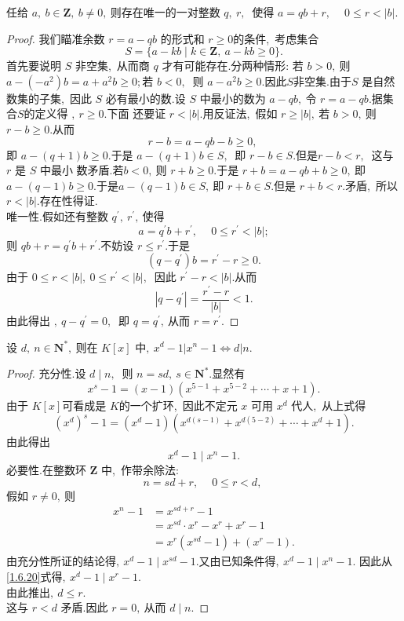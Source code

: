 \newpage
\begin{theorem}
	任给 $ a,\  b \in \mathbf{Z},\  b \neq 0 ,\  $则存在唯一的一对整数 $ q,\  r ,\ $ 使得
	$a=q b+r,\  \quad 0 \leqslant r<|b| .$
\end{theorem}
\begin{proof}
	我们瞄准余数  $r=a-q b$  的形式和 $ r \geqslant 0  $的条件,\  考虑集合
	$$S=\{a-k b \mid k \in \mathbf{Z},\  a-k b \geqslant 0\} .$$
	首先要说明 $ S $ 非空集,\  从而商 $ q $ 才有可能存在.分两种情形: 若  $b>0 ,\  $则  $a-\left(-a^{2}\right) b   =a+a^{2} b \geqslant 0 ; $若 $ b<0 ,\ $ 则 $ a-a^{2} b \geqslant 0 .$因此$  S  $非空集.由于$  S $ 是自然数集的子集,\  因此 $ S $ 必有最小的数.设 $ S $ 中最小的数为  $a-q b ,\  $令 $ r=a-q b .$据集合$  S  $的定义得 $,\  r \geqslant 0  .$下面 还要证 $ r<|b| .$用反证法,\  假如 $ r \geqslant|b| ,\  $若 $ b>0 ,\  $则  $r-b \geqslant 0  .$从而
	$$r-b=a-q b-b \geqslant 0,\ $$
	即  $a-(q+1) b \geqslant 0 .$于是  $a-(q+1) b \in S ,\ $ 即 $ r-b \in S .$但是$  r-b<r ,\ $ 这与 $ r $ 是  $S $ 中最小 数矛盾.若$  b<0 ,\  $则 $ r+b \geqslant 0  .$于是  $r+b=a-q b+b \geqslant 0 ,\  $即 $ a-(q-1) b \geqslant 0  .$于是$  a-(q-1) b \in S ,\  $即  $r+b \in S  .$但是  $r+b<r  .$矛盾,\  所以  $r<|b|  .$存在性得证.\\
	唯一性.假如还有整数  $q^{\prime},\  r^{\prime} ,\  $使得
	$$a=q^{\prime} b+r^{\prime},\  \quad 0 \leqslant r^{\prime}<|b| ;$$
	则 $ q b+r=q^{\prime} b+r^{\prime}  .$不妨设 $ r \leqslant r^{\prime}  .$于是
	$$\left(q-q^{\prime}\right) b=r^{\prime}-r \geqslant 0 .$$
	由于 $ 0 \leqslant r<|b|,\  0 \leqslant r^{\prime}<|b| ,\ $ 因此 $ r^{\prime}-r<|b|  .$从而
	$$\left|q-q^{\prime}\right|=\frac{r^{\prime}-r}{|b|}<1 .$$
	由此得出 $,\  q-q^{\prime}=0 ,\ $ 即 $ q=q^{\prime} ,\  $从而  $r=r^{\prime}  .$
\end{proof}
\newpage
\begin{problem}
	设  $d,\  n \in \mathbf{N}^{*} ,\  $则在  $K[x] $ 中$,\   x^{d}-1\left|x^{n}-1 \Longleftrightarrow d\right| n  .$
\end{problem}
\begin{proof}
	充分性.设 $ d \mid n ,\ $ 则  $n=s d,\  s \in \mathbf{N}^{*}  .$显然有
	$$x^{s}-1=(x-1)\left(x^{5-1}+x^{5-2}+\cdots+x+1\right) .$$
	由于 $ K[x]  $可看成是 $ K  $的一个扩环,\  因此不定元 $ x $ 可用  $x^{d} $ 代人,\  从上式得
	$$\left(x^{d}\right)^{s}-1=\left(x^{d}-1\right)\left(x^{d(s-1)}+x^{d(5-2)}+\cdots+x^{d}+1\right) .$$
	由此得出
	$$x^{d}-1 \mid x^{n}-1.$$
	必要性.在整数环  $\mathbf{Z}$  中,\  作带余除法:
	$$n=s d+r,\  \quad 0 \leqslant r<d,\ $$
	假如 $ r \neq 0 ,\  $则
	\begin{align}
		x^{n}-1 & =x^{s d+r}-1 \nonumber\\
		& =x^{sd} \cdot x^{r}-x^{r}+x^{r}-1 \nonumber\\
		& =x^{r}\left(x^{sd}-1\right)+\left(x^{r}-1\right) .\label{1.6.20}
	\end{align}
	由充分性所证的结论得$,\   x^{d}-1 \mid x^{sd}-1  .$又由已知条件得$,\   x^{d}-1 \mid x^{n}-1  .$ 因此从\eqref{1.6.20}式得$,\   x^{d}-1\mid x^{r}-1  .$\\
	由此推出$,\   d \leqslant r  .$\\
	这与 $ r<d $ 矛盾.因此  $r=0 ,\  $从而  $d \mid n  .$
\end{proof}
